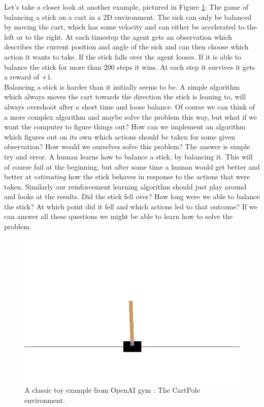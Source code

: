 
Let's take a closer look at another example, pictured in Figure \ref{fig:CartPole}: The game of balancing a stick on a cart in a 2D environment. The sick can only be balanced by moving the cart, which has some velocity and can either be accelerated to the left or to the right. At each timestep the agent gets an observation which describes the current position and angle of the sick and can then choose which action it wants to take. If the stick falls over the agent looses. If it is able to balance the stick for more than 200 steps it wins. At each step it survives it gets a reward of $+1$. \\
Balancing a stick is harder than it initially seems to be. A simple algorithm which always moves the cart towards the direction the stick is leaning to, will always overshoot after a short time and loose balance. Of course we can think of a more complex algorithm and maybe solve the problem this way, but what if we want the computer to figure things out? How can we implement an algorithm which figures out on its own which actions should be taken for some given observation? How would we ourselves solve this problem? The answer is simple try and error. A human learns how to balance a stick, by balancing it. This will of course fail at the beginning, but after some time a human would get better and better at \textit{estimating} how the stick behaves in response to the actions that were taken. Similarly our reinforcement learning algorithm should just play around and looks at the results. Did the stick fell over? How long were we able to balance the stick? At which point did it fell and which actions led to that outcome? If we can answer all these questions we might be able to learn how to solve the problem. \\

\begin{figure}[ht]
  
  \begin{center}
      \includegraphics[trim=0px 50px 0px 100px, clip, width=0.6\columnwidth]{figures/rl/CartPole.jpg}
  \end{center}
  
  \caption[CartPole Environment]{A classic toy example from OpenAI gym \cite{openAIgym}: The CartPole environment.}
  \label{fig:CartPole}
\end{figure}


